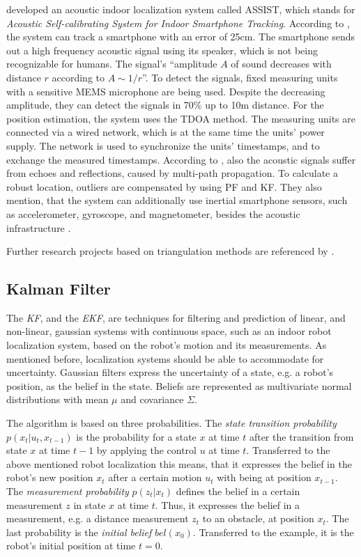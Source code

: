 \citet{hoflinger:acoustic} developed an acoustic indoor localization system called ASSIST, which stands for \emph{Acoustic Self-calibrating System for Indoor Smartphone Tracking}. According to \citet{hoflinger:acoustic}, the system can track a smartphone with an error of 25cm. The smartphone sends out a high frequency acoustic signal using its speaker, which is not being recognizable for humans. The signal's ``amplitude $A$ of sound decreases with distance $r$ according to $A \sim 1/r$''. To detect the signals, fixed measuring units with a sensitive \ac{MEMS} microphone are being used. Despite the decreasing amplitude, they can detect the signals in 70\% up to 10m distance. For the position estimation, the system uses the \ac{TDOA} method. The measuring units are connected via a wired network, which is at the same time the units' power supply. The network is used to synchronize the units' timestamps, and to exchange the measured timestamps. According to \citet{hoflinger:acoustic}, also the acoustic signals suffer from echoes and reflections, caused by multi-path propagation. To calculate a robust location, outliers are compensated by using \ac{PF} and \ac{KF}. They also mention, that the system can additionally use inertial smartphone sensors, such as accelerometer, gyroscope, and magnetometer, besides the acoustic infrastructure \citep{hoflinger:acoustic, hoflinger:assist}.

Further research projects based on triangulation methods are referenced by \citet{IEEE:survey_wireless_indoor_pos}.


\subsection{Kalman Filter}\label{sec:fund_kf}
The \emph{\ac{KF}}, and the \emph{\ac{EKF}}, are techniques for filtering and prediction of linear, and non-linear, gaussian systems with continuous space, such as an indoor robot localization system, based on the robot's motion and its measurements. As mentioned before, localization systems should be able to accommodate for uncertainty. Gaussian filters express the uncertainty of a state, e.g. a robot's position, as the belief in the state. Beliefs are represented as multivariate normal distributions with mean $\mu$ and covariance $\Sigma$. %

The algorithm is based on three probabilities. The \emph{state transition probability} $p(x_t | u_t , x_{t-1})$ is the probability for a state $x$ at time $t$ after the transition from state $x$ at time $t-1$ by applying the control $u$ at time $t$. Transferred to the above mentioned robot localization this means, that it expresses the belief in the robot's new position $x_t$ after a certain motion $u_t$ with being at position $x_{t-1}$. The \emph{measurement probability} $p(z_t|x_t)$ defines the belief in a certain measurement $z$ in state $x$ at time $t$. Thus, it expresses the belief in a measurement, e.g. a distance measurement $z_t$ to an obstacle, at position $x_t$. The last probability is the \emph{initial belief} $bel(x_0)$. Transferred to the example, it is the robot's initial position at time $t = 0$.

